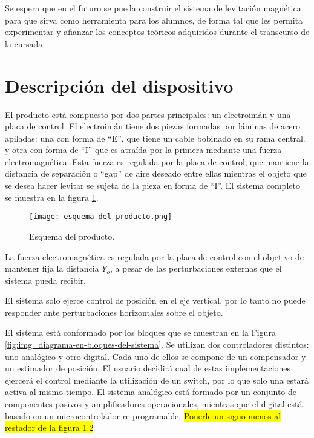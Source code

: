 \noindent Se espera que en el futuro se pueda construir el sistema de levitación magnética para que sirva como herramienta para los alumnos, de forma tal que les permita experimentar y afianzar los conceptos teóricos adquiridos durante el transcurso de la cursada.



\section{Descripción del dispositivo}

\noindent El producto está compuesto por dos partes principales: un electroimán y una placa de control. El electroimán tiene dos piezas formadas por láminas de acero apiladas: una con forma de “E”, que tiene un cable bobinado en su rama central. y otra con forma de “I” que es atraída por la primera mediante una fuerza electromagnética. Esta fuerza es regulada por la placa de control, que mantiene la distancia de separación o “gap” de aire deseado entre ellas mientras el objeto que se desea hacer levitar se sujeta de la pieza en forma de “I”. El sistema completo se muestra en la figura \ref{fig:img_Esquema-del-producto}.

\begin{figure}[H]
	\centering
	\texttt{[image: esquema-del-producto.png]}
	\caption{Esquema del producto.}
	\label{fig:img_Esquema-del-producto}
\end{figure}

\noindent La fuerza electromagnética es regulada por la placa de control con el objetivo de mantener fija la distancia $Y_{o}$, a pesar de las perturbaciones externas que el sistema pueda recibir. 


\noindent El sistema solo ejerce control de posición en el eje vertical, por lo tanto no puede responder ante perturbaciones horizontales sobre el objeto.


\noindent El sistema está conformado por los bloques que se muestran en la Figura \ref{fig:img_diagrama-en-bloques-del-sistema}. Se utilizan dos controladores distintos: uno analógico y otro digital. Cada uno de ellos se compone de un compensador y un estimador de posición.  El usuario decidirá cual de estas implementaciones ejercerá el control mediante la utilización de un switch, por lo que solo una estará activa al mismo tiempo. El sistema analógico está formado por un conjunto de componentes pasivos y amplificadores operacionales, mientras que el digital está basado en un microcontrolador re-programable.
\colorbox{yellow}{Ponerle un signo menos al restador de la figura 1.2}

